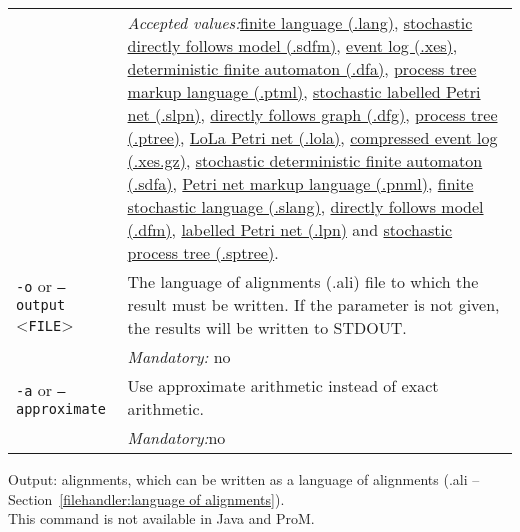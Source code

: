 {\begin{tabularx}{\linewidth}{lX}
&\textit{Accepted values:}\quad \hyperref[filehandler:finite language]{finite language (.lang)}, \hyperref[filehandler:stochastic directly follows model]{stochastic directly follows model (.sdfm)}, \hyperref[filehandler:event log]{event log (.xes)}, \hyperref[filehandler:deterministic finite automaton]{deterministic finite automaton (.dfa)}, \hyperref[filehandler:process tree markup language]{process tree markup language (.ptml)}, \hyperref[filehandler:stochastic labelled Petri net]{stochastic labelled Petri net (.slpn)}, \hyperref[filehandler:directly follows graph]{directly follows graph (.dfg)}, \hyperref[filehandler:process tree]{process tree (.ptree)}, \hyperref[filehandler:LoLa Petri net]{LoLa Petri net (.lola)}, \hyperref[filehandler:compressed event log]{compressed event log (.xes.gz)}, \hyperref[filehandler:stochastic deterministic finite automaton]{stochastic deterministic finite automaton (.sdfa)}, \hyperref[filehandler:Petri net markup language]{Petri net markup language (.pnml)}, \hyperref[filehandler:finite stochastic language]{finite stochastic language (.slang)}, \hyperref[filehandler:directly follows model]{directly follows model (.dfm)}, \hyperref[filehandler:labelled Petri net]{labelled Petri net (.lpn)} and \hyperref[filehandler:stochastic process tree]{stochastic process tree (.sptree)}.\\
\texttt{-o} or \texttt{--output} <\texttt{FILE}> &
The language of alignments (.ali) file to which the result must be written. If the parameter is not given, the results will be written to STDOUT.\\
&\textit{Mandatory:} \quad no\\
\texttt{-a} or \texttt{--approximate} & Use approximate arithmetic instead of exact arithmetic.\\
&\textit{Mandatory:}\quad no\\
\bottomrule
\end{tabularx}
\noindent Output: alignments, which can be written as a language of alignments (.ali -- Section~\ref{filehandler:language of alignments}).
\\This command is not available in Java and ProM.
}
